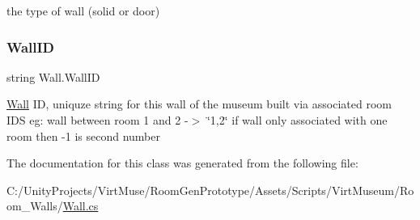 the type of wall (solid or door) 

\mbox{\label{class_wall_a44f8ec4294e23148d51bcd33206a78c7}} 
\subsubsection{\texorpdfstring{Wall\+ID}{WallID}}
{\footnotesize\ttfamily string Wall.\+Wall\+ID\hspace{0.3cm}{\ttfamily [get]}}



\mbox{\hyperlink{class_wall}{Wall}} ID, uniquze string for this wall of the museum built via associated room I\+DS eg\+: wall between room 1 and 2 -\/$>$ \char`\"{}1,2\char`\"{} if wall only associated with one room then -\/1 is second number 



The documentation for this class was generated from the following file\+:\begin{DoxyCompactItemize}
\item 
C\+:/\+Unity\+Projects/\+Virt\+Muse/\+Room\+Gen\+Prototype/\+Assets/\+Scripts/\+Virt\+Museum/\+Room\+\_\+\+Walls/\mbox{\hyperlink{_wall_8cs}{Wall.\+cs}}\end{DoxyCompactItemize}
